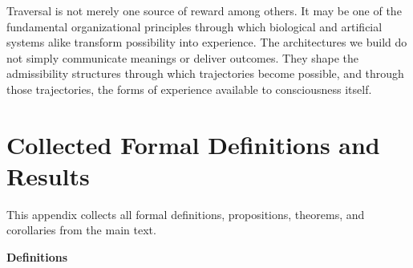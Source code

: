 \documentclass[12pt, a4paper]{article}
\theoremstyle{plain}
\theoremstyle{definition}
\theoremstyle{remark}
\begin{document}
\bigskip

\begin{center}
\end{center}

\bigskip

\noindent Traversal is not merely one source of reward
among others. It may be one of the fundamental
organizational principles through which biological and
artificial systems alike transform possibility into
experience. The architectures we build do not simply
communicate meanings or deliver outcomes. They shape the
admissibility structures through which trajectories become
possible, and through those trajectories, the forms of
experience available to consciousness itself.

\appendix
\section{Collected Formal Definitions and Results}
\label{sec:appendix}

This appendix collects all formal definitions, propositions,
theorems, and corollaries from the main text.

\medskip\noindent\textbf{Definitions}
\end{document}
